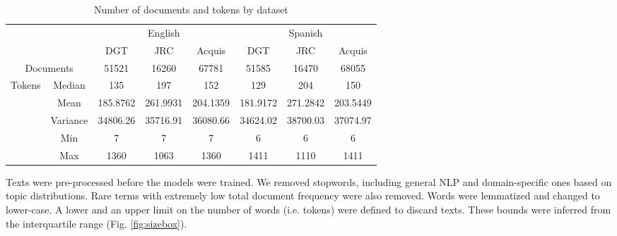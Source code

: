 \begin{table}[ht]
\centering
\begin{adjustbox}{max width=0.9\textwidth}
\begin{tabular}{cc|ccc|ccc}
\cline{3-8}
                           &          & \multicolumn{3}{c|}{English}        & \multicolumn{3}{c}{Spanish}         \\ \cline{3-8} 
                           &          & DGT      & JRC      & Acquis   & DGT      & JRC      & Acquis   \\ \hline
\multicolumn{2}{c|}{Documents}      & 51521    & 16260    & 67781    & 51585    & 16470    & 68055    \\ \hline
\multirow{5}{*}{Tokens} & Median   & 135      & 197      & 152      & 129      & 204      & 150      \\
                           & Mean     & 185.8762 & 261.9931 & 204.1359 & 181.9172 & 271.2842 & 203.5449 \\
                           & Variance & 34806.26 & 35716.91 & 36080.66 & 34624.02 & 38700.03 & 37074.97 \\
                           & Min      & 7        & 7        & 7        & 6        & 6        & 6        \\
                           & Max      & 1360     & 1063     & 1360     & 1411     & 1110     & 1411     \\ \hline
\end{tabular}%
\end{adjustbox}
\vspace*{3mm}
\caption{Number of documents and tokens by dataset}
\label{table:acquis_summ}

\end{table}


Texts were pre-processed before the models were trained. We removed stopwords, including general NLP and domain-specific ones based on topic distributions. Rare terms with extremely low total document frequency were also removed. Words were lemmatized and changed to lower-case. A lower and an upper limit on the number of words (i.e. tokens) were defined to discard texts. These bounds were inferred from the interquartile range (Fig. \ref{fig:sizebox}). 


